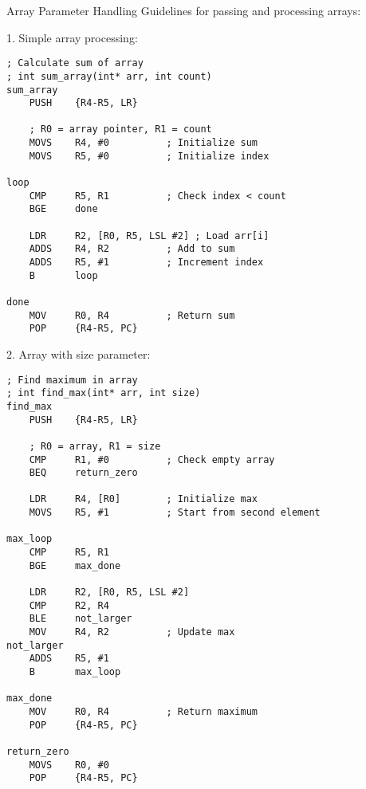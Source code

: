 \begin{KR}{Array Parameter Handling}
Guidelines for passing and processing arrays:

1. Simple array processing:
\begin{lstlisting}[language=armasm, style=basesmol]
; Calculate sum of array
; int sum_array(int* arr, int count)
sum_array
    PUSH    {R4-R5, LR}
    
    ; R0 = array pointer, R1 = count
    MOVS    R4, #0          ; Initialize sum
    MOVS    R5, #0          ; Initialize index
    
loop
    CMP     R5, R1          ; Check index < count
    BGE     done
    
    LDR     R2, [R0, R5, LSL #2] ; Load arr[i]
    ADDS    R4, R2          ; Add to sum
    ADDS    R5, #1          ; Increment index
    B       loop
    
done
    MOV     R0, R4          ; Return sum
    POP     {R4-R5, PC}
\end{lstlisting}

2. Array with size parameter:
\begin{lstlisting}[language=armasm, style=basesmol]
; Find maximum in array
; int find_max(int* arr, int size)
find_max
    PUSH    {R4-R5, LR}
    
    ; R0 = array, R1 = size
    CMP     R1, #0          ; Check empty array
    BEQ     return_zero
    
    LDR     R4, [R0]        ; Initialize max
    MOVS    R5, #1          ; Start from second element
    
max_loop
    CMP     R5, R1
    BGE     max_done
    
    LDR     R2, [R0, R5, LSL #2]
    CMP     R2, R4
    BLE     not_larger
    MOV     R4, R2          ; Update max
not_larger
    ADDS    R5, #1
    B       max_loop
    
max_done
    MOV     R0, R4          ; Return maximum
    POP     {R4-R5, PC}
    
return_zero
    MOVS    R0, #0
    POP     {R4-R5, PC}
\end{lstlisting}
\end{KR}

